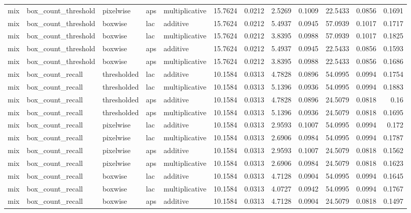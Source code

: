 \begin{table*}[htbp]
\begin{tabular}{@{}lllll rrcrrcr@{}}
mix & box\_count\_threshold & pixelwise & aps & multiplicative & 15.7624 & 0.0212 & 2.5269 & 0.1009 & 22.5433 & 0.0856 & 0.1691 \\
mix & box\_count\_threshold & boxwise & lac & additive & 15.7624 & 0.0212 & 5.4937 & 0.0945 & 57.0939 & 0.1017 & 0.1717 \\
mix & box\_count\_threshold & boxwise & lac & multiplicative & 15.7624 & 0.0212 & 3.8395 & 0.0988 & 57.0939 & 0.1017 & 0.1825 \\
mix & box\_count\_threshold & boxwise & aps & additive & 15.7624 & 0.0212 & 5.4937 & 0.0945 & 22.5433 & 0.0856 & 0.1593 \\
mix & box\_count\_threshold & boxwise & aps & multiplicative & 15.7624 & 0.0212 & 3.8395 & 0.0988 & 22.5433 & 0.0856 & 0.1686 \\
mix & box\_count\_recall & thresholded & lac & additive & 10.1584 & 0.0313 & 4.7828 & 0.0896 & 54.0995 & 0.0994 & 0.1754 \\
mix & box\_count\_recall & thresholded & lac & multiplicative & 10.1584 & 0.0313 & 5.1396 & 0.0936 & 54.0995 & 0.0994 & 0.1883 \\
mix & box\_count\_recall & thresholded & aps & additive & 10.1584 & 0.0313 & 4.7828 & 0.0896 & 24.5079 & 0.0818 & 0.16 \\
mix & box\_count\_recall & thresholded & aps & multiplicative & 10.1584 & 0.0313 & 5.1396 & 0.0936 & 24.5079 & 0.0818 & 0.1695 \\
mix & box\_count\_recall & pixelwise & lac & additive & 10.1584 & 0.0313 & 2.9593 & 0.1007 & 54.0995 & 0.0994 & 0.172 \\
mix & box\_count\_recall & pixelwise & lac & multiplicative & 10.1584 & 0.0313 & 2.6906 & 0.0984 & 54.0995 & 0.0994 & 0.1787 \\
mix & box\_count\_recall & pixelwise & aps & additive & 10.1584 & 0.0313 & 2.9593 & 0.1007 & 24.5079 & 0.0818 & 0.1562 \\
mix & box\_count\_recall & pixelwise & aps & multiplicative & 10.1584 & 0.0313 & 2.6906 & 0.0984 & 24.5079 & 0.0818 & 0.1623 \\
mix & box\_count\_recall & boxwise & lac & additive & 10.1584 & 0.0313 & 4.7128 & 0.0904 & 54.0995 & 0.0994 & 0.1645 \\
mix & box\_count\_recall & boxwise & lac & multiplicative & 10.1584 & 0.0313 & 4.0727 & 0.0942 & 54.0995 & 0.0994 & 0.1767 \\
mix & box\_count\_recall & boxwise & aps & additive & 10.1584 & 0.0313 & 4.7128 & 0.0904 & 24.5079 & 0.0818 & 0.1497 \\

\end{tabular}
\end{table*}
